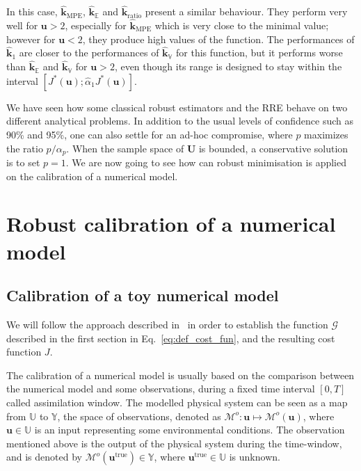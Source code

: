\documentclass[preprint, 1p]{elsarticle}
\newcommand{\Ex}{\mathbb{E}}
\newcommand{\hatkmean}{\hat{\mathbf{k}}_{\Ex}}
\newcommand{\hatkvar}{\hat{\mathbf{k}}_{\mathbb{V}}}
\newcommand{\hatkmpe}{\hat{\mathbf{k}}_{\mathrm{MPE}}}
\newcommand{\RRE}{RRE}
\newcommand{\checka}{{\alpha}}
\newcommand{\checkk}{\mathbf{k}}
\newcommand{\Uspace}{\mathbb{U}}
\begin{document}
In this case, $\hatkmpe$, $\hatkmean$ and $\hat{\checkk}_{\mathrm{ratio}}$ present a similar behaviour.
They perform very well for $\mathbf{u}>2$, especially for $\hatkmpe$ which is very close to the minimal value; however for $\mathbf{u}<2$, they produce high values of the function.
The performances of $\hat{\checkk}_1$ are closer to the performances of $\hatkvar$ for this function, but it performs worse than $\hatkmean$ and $\hatkvar$ for $\mathbf{u}>2$, even though its range is designed to stay within the interval $[J^*(\mathbf{u}); \hat{\checka}_1 J^*(\mathbf{u})]$.



We have seen how some classical robust estimators and the \RRE{} behave on two different analytical problems. In addition to the usual levels of confidence such as 90\% and 95\%, one can also settle for an ad-hoc compromise, where $p$ maximizes the ratio $p/\alpha_p$. When the sample space of $\mathbf{U}$ is bounded, a conservative solution is to set $p=1$.
We are now going to see how can robust minimisation is applied on the calibration of a numerical model.

\section{Robust calibration of a numerical model}
\label{sec:SWE_application}

\subsection{Calibration of a toy numerical model}
 We will follow the approach described in~\cite{kennedy_bayesian_2001} in order to establish the function $\mathcal{G}$ described in the first section in Eq.~\eqref{eq:def_cost_fun}, and the resulting cost function $J$.
 
 The calibration of a numerical model is usually based on the comparison between the numerical model and some observations, during a fixed time interval $[0, T]$ called assimilation window.
 The modelled physical system can be seen as a map from $\Uspace$ to $\mathbb{Y}$, the space of observations, denoted as $\mathcal{M}^o : \mathbf{u}\mapsto \mathcal{M}^o(\mathbf{u})$, where $\mathbf{u}\in\Uspace$ is an input representing some environmental conditions. The observation mentioned above is the output of the physical system during the time-window, and is denoted by $\mathcal{M}^o(\mathbf{u}^{\mathrm{true}}) \in \mathbb{Y}$, where $\mathbf{u}^{\mathrm{true}} \in \Uspace$ is unknown.
\end{document}

